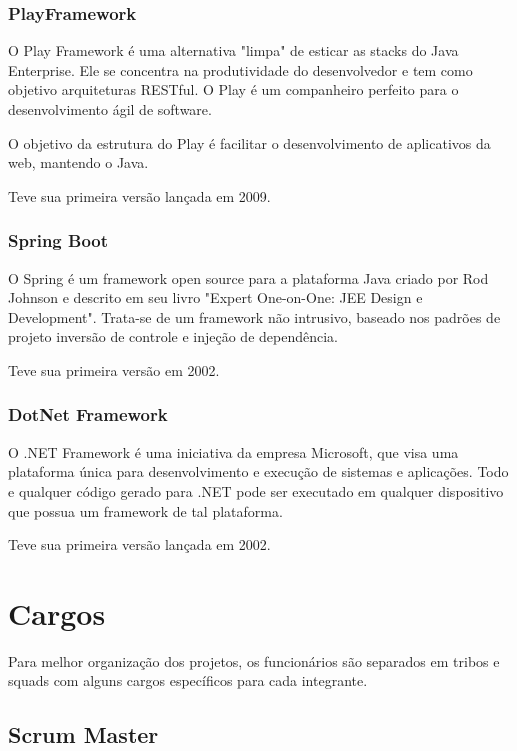 \subsubsection{PlayFramework}

O Play Framework é uma alternativa "limpa" de esticar as stacks do Java Enterprise. Ele se concentra na produtividade do desenvolvedor e tem como objetivo arquiteturas RESTful. O Play é um companheiro perfeito para o desenvolvimento ágil de software.

O objetivo da estrutura do Play é facilitar o desenvolvimento de aplicativos da web, mantendo o Java.

Teve sua primeira versão lançada em 2009.

\subsubsection{Spring Boot}

O Spring é um framework open source para a plataforma Java criado por Rod Johnson e descrito em seu livro "Expert One-on-One: JEE Design e Development". Trata-se de um framework não intrusivo, baseado nos padrões de projeto inversão de controle e injeção de dependência.

Teve sua primeira versão em 2002.

\subsubsection{DotNet Framework}

O .NET Framework é uma iniciativa da empresa Microsoft, que visa uma plataforma única para desenvolvimento e execução de sistemas e aplicações. Todo e qualquer código gerado para .NET pode ser executado em qualquer dispositivo que possua um framework de tal plataforma.

Teve sua primeira versão lançada em 2002.

\section{Cargos}

Para melhor organização dos projetos, os funcionários são separados em tribos e squads com alguns cargos específicos para cada integrante.

\subsection{Scrum Master}

